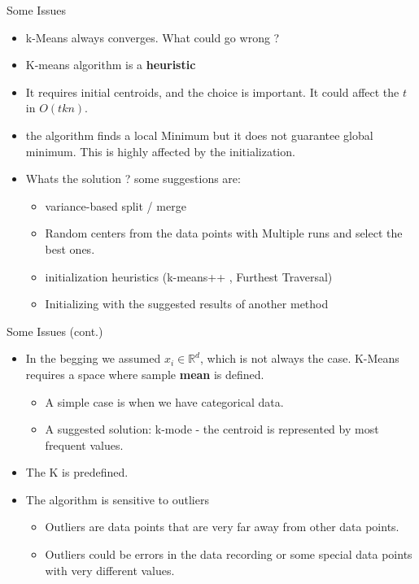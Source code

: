 \documentclass[serif, aspectratio=169]{beamer}
\begin{document}
\begin{frame}{Some Issues}
    \begin{itemize}
        \item k-Means always converges. What could go wrong ?
        \item K-means algorithm is a \textbf{heuristic}
        \item It requires initial centroids, and the choice is important. It could affect the $t$ in $O(tkn)$.
        \item the algorithm finds a local Minimum but it does not guarantee global minimum. This is highly affected by the initialization.
        \item Whats the solution ? some suggestions are:
        \begin{itemize}
            \item  variance-based split / merge
            \item Random centers from the data points with Multiple runs and select the best ones.
            \item initialization heuristics (k-means++ , Furthest Traversal)
            \item  Initializing with the suggested results of another method
        \end{itemize}
        
        
    \end{itemize}
\end{frame}

\begin{frame}{Some Issues (cont.)}
    \begin{itemize}
        \item In the begging we assumed $x_i \in \mathbb{R}^d$, which is not always the case. K-Means requires a space where sample \textbf{mean} is defined.
        \begin{itemize}
            \item A simple case is when we have categorical data. 
            \item  A suggested solution: k-mode - the centroid is represented by most frequent values.
        \end{itemize}
        \item The K is predefined.  
        \item The algorithm is sensitive to outliers
        \begin{itemize}
            \item Outliers are data points that are very far away from other data points. 
\item Outliers could be errors in the data recording or some special data points with very different values.
        \end{itemize}

    \end{itemize}
\end{frame}
\end{document}
